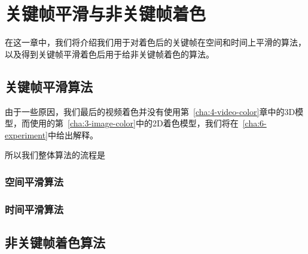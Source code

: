 \chapter{关键帧平滑与非关键帧着色}
\label{cha:5-other-algorithm}

  在这一章中，我们将介绍我们用于对着色后的关键帧在空间和时间上平滑的算法，以及得到关键帧平滑着色后用于给非关键帧着色的算法。

\section{关键帧平滑算法}
\label{sec:5-keyframe-smooth}

  由于一些原因，我们最后的视频着色并没有使用第~\ref{cha:4-video-color}章中的3D模型，而使用的第~\ref{cha:3-image-color}中的2D着色模型，我们将在~\ref{cha:6-experiment}中给出解释。

  所以我们整体算法的流程是

\subsection{空间平滑算法}
\label{sec:5-spatial-smooth}

\subsection{时间平滑算法}
\label{sec:5-temporal-smooth}

\section{非关键帧着色算法}
\label{sec:5-interframe-color}
